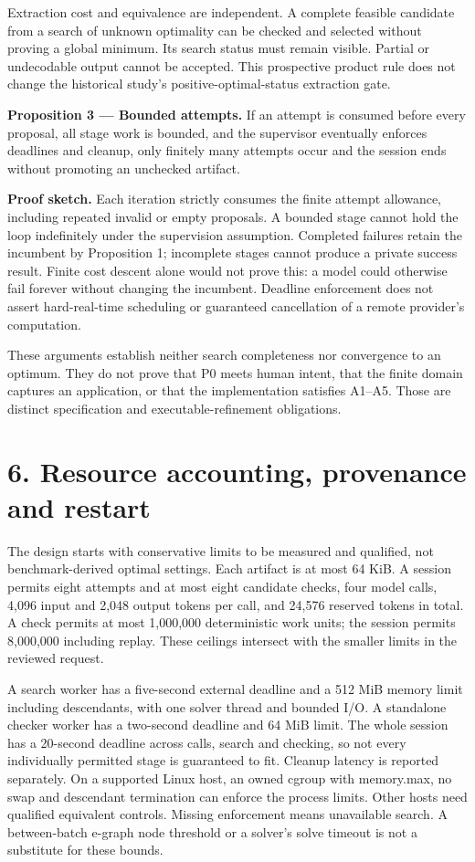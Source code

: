 \documentclass[11pt]{article}
\begin{document}
Extraction cost and equivalence are independent. A complete feasible candidate from a search of unknown optimality can be checked and selected without proving a global minimum. Its search status must remain visible. Partial or undecodable output cannot be accepted. This prospective product rule does not change the historical study's positive-optimal-status extraction gate.

\textbf{Proposition 3 --- Bounded attempts.} If an attempt is consumed before every proposal, all stage work is bounded, and the supervisor eventually enforces deadlines and cleanup, only finitely many attempts occur and the session ends without promoting an unchecked artifact.

\textbf{Proof sketch.} Each iteration strictly consumes the finite attempt allowance, including repeated invalid or empty proposals. A bounded stage cannot hold the loop indefinitely under the supervision assumption. Completed failures retain the incumbent by Proposition 1; incomplete stages cannot produce a private success result. Finite cost descent alone would not prove this: a model could otherwise fail forever without changing the incumbent. Deadline enforcement does not assert hard-real-time scheduling or guaranteed cancellation of a remote provider's computation.

These arguments establish neither search completeness nor convergence to an optimum. They do not prove that P0 meets human intent, that the finite domain captures an application, or that the implementation satisfies A1--A5. Those are distinct specification and executable-refinement obligations.

\section{6. Resource accounting, provenance and restart}

The design starts with conservative limits to be measured and qualified, not benchmark-derived optimal settings. Each artifact is at most 64 KiB. A session permits eight attempts and at most eight candidate checks, four model calls, 4,096 input and 2,048 output tokens per call, and 24,576 reserved tokens in total. A check permits at most 1,000,000 deterministic work units; the session permits 8,000,000 including replay. These ceilings intersect with the smaller limits in the reviewed request.

A search worker has a five-second external deadline and a 512 MiB memory limit including descendants, with one solver thread and bounded I/O. A standalone checker worker has a two-second deadline and 64 MiB limit. The whole session has a 20-second deadline across calls, search and checking, so not every individually permitted stage is guaranteed to fit. Cleanup latency is reported separately. On a supported Linux host, an owned cgroup with memory.max, no swap and descendant termination can enforce the process limits. Other hosts need qualified equivalent controls. Missing enforcement means unavailable search. A between-batch e-graph node threshold or a solver's solve timeout is not a substitute for these bounds.
\end{document}
